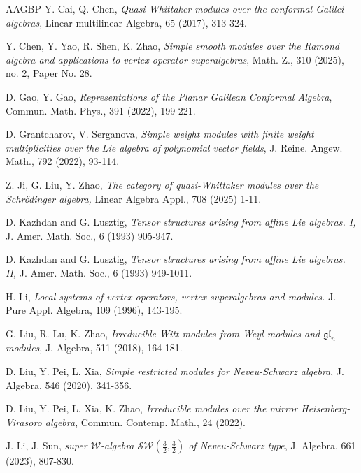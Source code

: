 \documentclass[12pt, a4paper]{amsart}
\def\gl{\mathfrak{gl}}
\theoremstyle{Theorem}
\theoremstyle{Theorem}
\numberwithin{equation}{section}
\begin{document}
\begin{thebibliography}{AAGBP}
 Y. Cai, Q. Chen, {\it Quasi-Whittaker modules over the conformal Galilei algebras}, Linear multilinear  Algebra, 65 (2017), 313-324.

 Y. Chen, Y. Yao, R. Shen, K. Zhao, {\it Simple smooth modules over the Ramond algebra and applications to vertex operator superalgebras},  Math. Z.,  310 (2025), no. 2, Paper No. 28.


 D. Gao, Y. Gao, {\it Representations of the Planar Galilean Conformal Algebra}, Commun. Math. Phys., 391 (2022), 199-221.

 D. Grantcharov, V. Serganova, {\it Simple weight modules with finite weight multiplicities over the Lie algebra of polynomial vector fields}, J. Reine. Angew. Math., 792 (2022), 93-114.

 Z. Ji, G. Liu, Y. Zhao,
{\it The category of quasi-Whittaker modules over the Schrödinger algebra,}
Linear Algebra Appl., 708 (2025) 1-11.

 D. Kazhdan and G. Lusztig, {\it Tensor structures arising from affine Lie algebras. I,}  
J. Amer. Math. Soc., 6 (1993) 905-947.

D. Kazhdan and G. Lusztig, {\it Tensor structures arising from affine Lie algebras. II,}
J. Amer. Math. Soc., 6 (1993) 949-1011.

 H. Li, {\it Local systems of vertex operators, vertex superalgebras and modules.} J. Pure Appl. Algebra, 109 (1996), 143-195.


 G. Liu, R. Lu, K. Zhao, {\it Irreducible Witt modules from Weyl modules and
	$\gl_n$-modules}, J. Algebra, 511 (2018), 164-181.

 D. Liu, Y. Pei, L. Xia, {\it Simple restricted modules for Neveu-Schwarz algebra}, J. Algebra, 546 (2020), 341-356.

 D. Liu, Y. Pei, L. Xia, K. Zhao, {\it Irreducible modules over the mirror Heisenberg-Virasoro algebra}, Commun. Contemp. Math., 24 (2022).

 J. Li, J. Sun, {\it super $\mathscr{W}$-algebra $\mathscr{SW}(\frac{3}{2},\frac{3}{2})$ of Neveu-Schwarz type}, J. Algebra, 661 (2023), 807-830.


\end{thebibliography}
\end{document}
